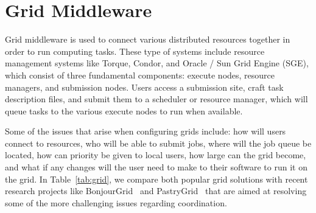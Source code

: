 \documentclass[conference]{IEEEtran}
\begin{document}
\section{Grid Middleware}
\label{middleware}

Grid middleware is used to connect various distributed resources together in
order to run computing tasks.  These type of systems include resource
management systems like Torque, Condor, and Oracle / Sun Grid Engine (SGE),
which consist of three fundamental components: execute nodes, resource
managers, and submission nodes.  Users access a submission site, craft task
description files, and submit them to a scheduler or resource manager, which
will queue tasks to the various execute nodes to run when available.

Some of the issues that arise when configuring grids include:  how will users
connect to resources, who will be able to submit jobs, where will the job queue
be located, how can priority be given to local users, how large can the grid
become, and what if any changes will the user need to make to their software to
run it on the grid.  In Table~\ref{tab:grid}, we compare both popular grid
solutions with recent research projects like BonjourGrid~\cite{bonjourgrid} and
PastryGrid~\cite{pastrygrid} that are aimed at resolving some of the more
challenging issues regarding coordination.
\end{document}
